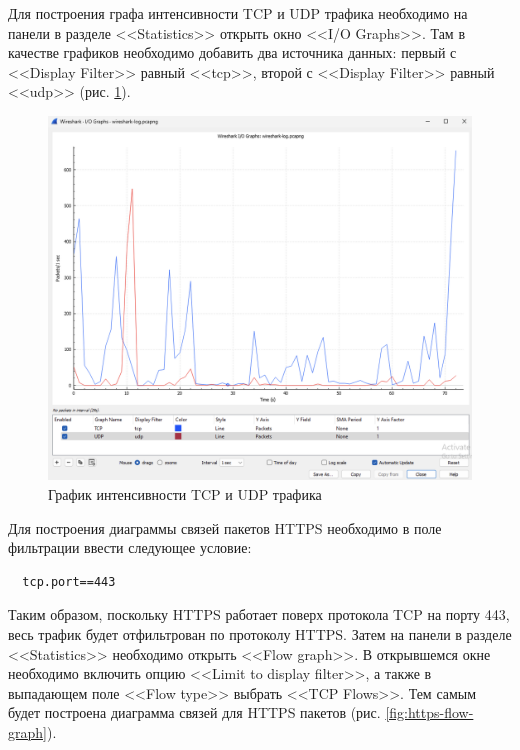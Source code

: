 \documentclass[a4paper, 14pt]{extarticle}
\begin{document}
Для построения графа интенсивности TCP и UDP трафика необходимо на панели в
разделе <<Statistics>> открыть окно <<I/O Graphs>>. Там в качестве графиков
необходимо добавить два источника данных: первый с <<Display Filter>> равный
<<tcp>>, второй с <<Display Filter>> равный <<udp>> (рис.
\ref{fig:tcp-udp-graph}).

\begin{figure}[H]
  \centering
  \includegraphics[width=\textwidth]{images/tcp-udp-graph.png}
  \caption{График интенсивности TCP и UDP трафика}
  \label{fig:tcp-udp-graph}
\end{figure}

Для построения диаграммы связей пакетов HTTPS необходимо в поле фильтрации
ввести следующее условие:
\begin{verbatim}
  tcp.port==443
\end{verbatim}
Таким образом, поскольку HTTPS работает поверх протокола TCP на порту 443, весь
трафик будет отфильтрован по протоколу HTTPS. Затем на панели в разделе
<<Statistics>> необходимо открыть <<Flow graph>>. В открывшемся окне необходимо
включить опцию <<Limit to display filter>>, а также в выпадающем поле <<Flow
type>> выбрать <<TCP Flows>>. Тем самым будет построена диаграмма связей для
HTTPS пакетов (рис. \ref{fig:https-flow-graph}).
\end{document}
